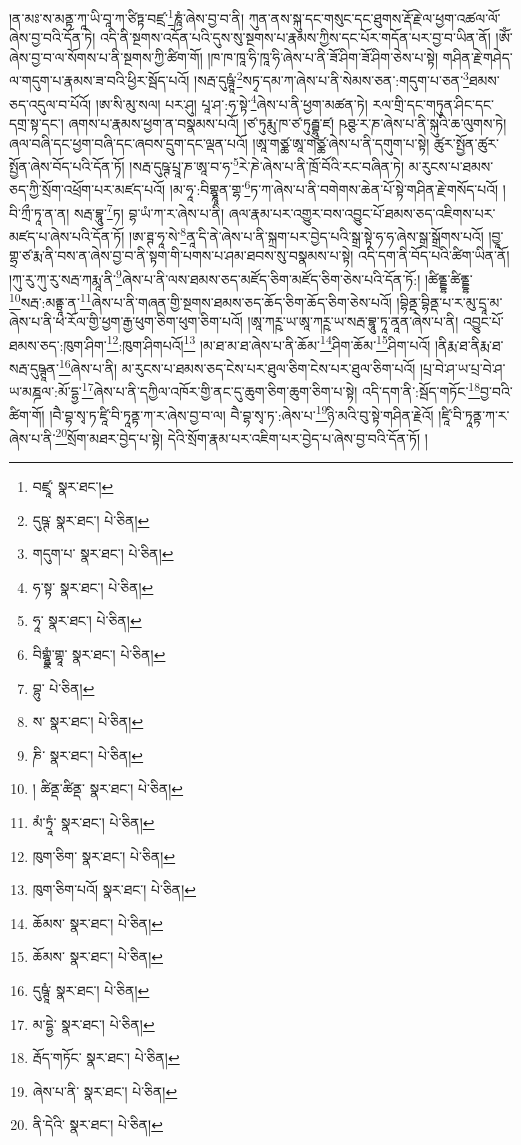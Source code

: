 །ན་མཿ་ས་མནྟ་ཀཱ་ཡི་བཱ་ཀ་ཙིཏྟ་བཛྲ་\footnote{བཛྲཱ་  སྣར་ཐང་། }ཎཱཾ་ཞེས་བྱ་བ་ནི། ཀུན་ནས་སྐུ་དང་གསུང་དང་ཐུགས་རྡོ་རྗེ་ལ་ཕྱག་འཚལ་ལོ་ཞེས་བྱ་བའི་དོན་ཏེ། འདི་ནི་སྔགས་འདོན་པའི་དུས་སུ་སྔགས་པ་རྣམས་ཀྱིས་དང་པོར་གདོན་པར་བྱ་བ་ཡིན་ནོ། །ཨོཾ་ཞེས་བྱ་བ་ལ་སོགས་པ་ནི་སྔགས་ཀྱི་ཚིག་གོ། །ཁ་ཁ་ཁཱ་ཧི་ཁཱ་ཧི་ཞེས་པ་ནི་ཟོ་ཤིག་ཟོ་ཤིག་ཅེས་པ་སྟེ། གཤིན་རྗེ་གཤེད་ལ་གདུག་པ་རྣམས་ཟ་བའི་ཕྱིར་སྦོད་པའོ། །སརྦ་དུཥྚཱཾ་\footnote{དུཥྚ་  སྣར་ཐང་།  པེ་ཅིན། }སཏྭ་དམ་ཀ་ཞེས་པ་ནི་སེམས་ཅན་:གདུག་པ་ཅན་\footnote{གདུག་པ་  སྣར་ཐང་།  པེ་ཅིན། }ཐམས་ཅད་འདུལ་བ་པོའོ། །ཨ་སི་མུ་སལ། པར་ཤུ། པཱ་ཤ་:ཧ་སྟེ་\footnote{ཧ་སྟ་  སྣར་ཐང་།  པེ་ཅིན། }ཞེས་པ་ནི་ཕྱག་མཚན་ཏེ། རལ་གྲི་དང་གཏུན་ཤིང་དང་དགྲ་སྟ་དང་། ཞགས་པ་རྣམས་ཕྱག་ན་བསྣམས་པའོ། །ཙ་ཏུརྨུ་ཁ་ཙ་ཏུརྦྷུ་ཛ། ཥཊྩ་ར་ཎ་ཞེས་པ་ནི་སྐུའི་ཆ་ལུགས་ཏེ། ཞལ་བཞི་དང་ཕྱག་བཞི་དང་ཞབས་དྲུག་དང་ལྡན་པའོ། །ཨཱ་གཙྪ་ཨཱ་གཙྪ་ཞེས་པ་ནི་དགུག་པ་སྟེ། ཚུར་སྤྱོན་ཚུར་སྤྱོན་ཞེས་བོད་པའི་དོན་ཏོ། །སརྦ་དུཥྚ་པྲཱ་ཎ་ཨཱ་བ་ཧ་\footnote{ཧཱ་  སྣར་ཐང་།  པེ་ཅིན། }རེ་ཎེ་ཞེས་པ་ནི་ཁྲོ་བོའི་རང་བཞིན་ཏེ། མ་རུངས་པ་ཐམས་ཅད་ཀྱི་སྲོག་འཕྲོག་པར་མཛད་པའོ། །མ་ཧཱ་:བིགྷྣཱན་གྷ་\footnote{བིགྷྷྣཾ་གྷཱ་  སྣར་ཐང་།  པེ་ཅིན། }ཏ་ཀ་ཞེས་པ་ནི་བགེགས་ཆེན་པོ་སྟེ་གཤིན་རྗེ་གསོད་པའོ། །བི་ཀྲྀ་ཏཱ་ན་ན། སརྦ་བྷཱུ་\footnote{བྷུ་  པེ་ཅིན། }ཏ། བྷ་ཡཾ་ཀ་ར་ཞེས་པ་ནི། ཞལ་རྣམ་པར་འགྱུར་བས་འབྱུང་པོ་ཐམས་ཅད་འཇིགས་པར་མཛད་པ་ཞེས་པའི་དོན་ཏོ། །ཨ་ཊྚ་ཧཱ་སེ་\footnote{ས་  སྣར་ཐང་།  པེ་ཅིན། }ནཱ་དི་ནེ་ཞེས་པ་ནི་སྐྲག་པར་བྱེད་པའི་སྒྲ་སྟེ་ཧ་ཧ་ཞེས་སྒྲ་སྒྲོགས་པའོ། །བྱཱ་གྷྲ་ཙ་རྨ་ནི་བས་ན་ཞེས་བྱ་བ་ནི་སྟག་གི་པགས་པ་ཤམ་ཐབས་སུ་བསྣམས་པ་སྟེ། འདི་དག་ནི་བོད་པའི་ཚིག་ཡིན་ནོ། །ཀུ་རུ་ཀུ་རུ་སརྦ་ཀརྨཱ་ནི་\footnote{ཎི་  སྣར་ཐང་།  པེ་ཅིན། }ཞེས་པ་ནི་ལས་ཐམས་ཅད་མཛོད་ཅིག་མཛོད་ཅིག་ཅེས་པའི་དོན་ཏོ:། །ཚིནྡྷ་ཚིནྡྷ་\footnote{། ཚིནྡ་ཚིནྡ་  སྣར་ཐང་།  པེ་ཅིན། }སརྦ་:མནྟྲཱ་ན་\footnote{མཾ་ཏྲཱཾ་  སྣར་ཐང་།  པེ་ཅིན། }ཞེས་པ་ནི་གཞན་གྱི་སྔགས་ཐམས་ཅད་ཆོད་ཅིག་ཆོད་ཅིག་ཅེས་པའོ། །བྷིནྡ་བྷིནྡ་པ་ར་མུ་དྲཱ་མ་ཞེས་པ་ནི་ཕ་རོལ་གྱི་ཕྱག་རྒྱ་ཕུག་ཅིག་ཕུག་ཅིག་པའོ། །ཨཱ་ཀཪྵ་ཡ་ཨཱ་ཀཪྵ་ཡ་སརྦ་བྷཱུ་ཏཱ་ནཱན་ཞེས་པ་ནི། འབྱུང་པོ་ཐམས་ཅད་:ཁུག་ཤིག་\footnote{ཁུག་ཅིག་  སྣར་ཐང་།  པེ་ཅིན། }:ཁུག་ཤིགཔའོ།\footnote{ཁུག་ཅིག་པའོ།  སྣར་ཐང་།  པེ་ཅིན། } །མ་ཐ་མ་ཐ་ཞེས་པ་ནི་ཆོམ་\footnote{ཆོམས་  སྣར་ཐང་།  པེ་ཅིན། }ཤིག་ཆོམ་\footnote{ཆོམས་  སྣར་ཐང་།  པེ་ཅིན། }ཤིག་པའོ། །ནིརྨ་ཐ་ནིརྨ་ཐ་སརྦ་དུཥྚཱན་\footnote{དུཥྚཱཾ་  སྣར་ཐང་།  པེ་ཅིན། }ཞེས་པ་ནི། མ་རུངས་པ་ཐམས་ཅད་ངེས་པར་ཐུལ་ཅིག་ངེས་པར་ཐུལ་ཅིག་པའོ། །པྲ་བེ་ཤ་ཡ་པྲ་བེ་ཤ་ཡ་མཎྜལ་:མོ་དྷྱ་\footnote{མ་དྷྱེ་  སྣར་ཐང་།  པེ་ཅིན། }ཞེས་པ་ནི་དཀྱིལ་འཁོར་གྱི་ནང་དུ་ཆུག་ཅིག་ཆུག་ཅིག་པ་སྟེ། འདི་དག་ནི་:སྦོད་གཏོང་\footnote{རྦོད་གཏོང་  སྣར་ཐང་།  པེ་ཅིན། }བྱ་བའི་ཚིག་གོ། །བཻ་བྷ་སྭ་ཏ་ཛཱི་བི་ཏཱནྟ་ཀ་ར་ཞེས་བྱ་བ་ལ། བཻ་བྷ་སྭ་ཏ་:ཞེས་པ་\footnote{ཞེས་པ་ནི་  སྣར་ཐང་།  པེ་ཅིན། }ཉི་མའི་བུ་སྟེ་གཤིན་རྗེའོ། །ཛཱི་བི་ཏཱནྟ་ཀ་ར་ཞེས་པ་ནི་\footnote{ནི་དེའི་  སྣར་ཐང་།  པེ་ཅིན། }སྲོག་མཐར་བྱེད་པ་སྟེ། དེའི་སྲོག་རྣམ་པར་འཇིག་པར་བྱེད་པ་ཞེས་བྱ་བའི་དོན་ཏོ། །
